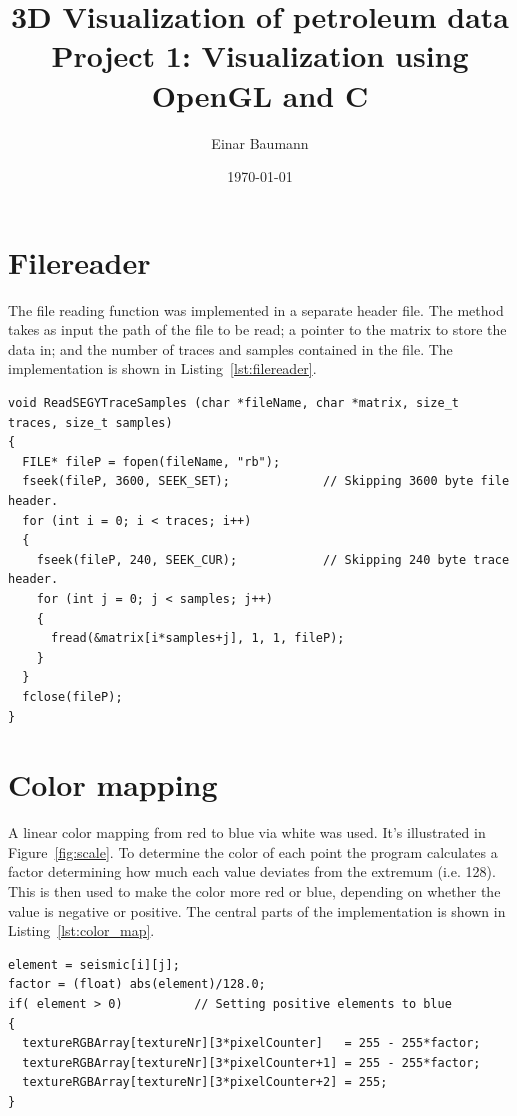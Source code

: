 \documentclass[a4paper, english, 12pt]{article}
\title{3D Visualization of petroleum data\\ 
\vspace{6pt}\large Project 1: Visualization using OpenGL and C \\ 
 }
\author{Einar Baumann}
\date{\today}
\begin{document}
\maketitle
\thispagestyle{empty}
\pagebreak


\section{Filereader}
\label{sec:filereader}
The file reading function was implemented in a separate header file. The method takes as input the path of the file to be read; a pointer to the matrix to store the data in; and the number of traces and samples contained in the file. The implementation is shown in Listing~\ref{lst:filereader}.

\begin{lstlisting}[label=lst:filereader, caption=SEGYReader.c]
void ReadSEGYTraceSamples (char *fileName, char *matrix, size_t traces, size_t samples)
{
  FILE* fileP = fopen(fileName, "rb");
  fseek(fileP, 3600, SEEK_SET);				// Skipping 3600 byte file header.
  for (int i = 0; i < traces; i++)
  {
    fseek(fileP, 240, SEEK_CUR);			// Skipping 240 byte trace header.
    for (int j = 0; j < samples; j++)
    {
      fread(&matrix[i*samples+j], 1, 1, fileP);
    }
  }
  fclose(fileP);
}
\end{lstlisting}



\section{Color mapping}
\label{sec:color_mapping}
A linear color mapping from red to blue via white was used. It's illustrated in Figure~\ref{fig:scale}. To determine the color of each point the program calculates a factor determining how much each value deviates from the extremum (i.e. 128). This is then used to make the color more red or blue, depending on whether the value is negative or positive. The central parts of the implementation is shown in Listing~\ref{lst:color_map}.



\begin{lstlisting}[label=lst:color_map, caption={Part of the color mapping implementation. The shown code calculates the factor used to determine the intensity of the color, as well as RGB color mapping of positive values.} ]
element = seismic[i][j];
factor = (float) abs(element)/128.0;
if( element > 0)          // Setting positive elements to blue
{
  textureRGBArray[textureNr][3*pixelCounter]   = 255 - 255*factor;
  textureRGBArray[textureNr][3*pixelCounter+1] = 255 - 255*factor;
  textureRGBArray[textureNr][3*pixelCounter+2] = 255;
}
\end{lstlisting}
\end{document}
